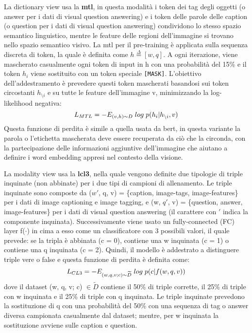 La dictionary view usa la \textbf{\acrfull{mtl}}, in questa modalità i token dei tag degli oggetti (o answer per i dati di visual question answering) e i token delle parole delle caption (o question per i dati di visual question answering) condividono lo stesso spazio semantico linguistico, mentre le feature delle regioni dell'immagine si trovano nello spazio semantico visivo. La \acrlong{mtl} per il pre-training è applicata sulla sequenza discreta di token, la quale è definita come $h \stackrel{\Delta}{=} [w, q]$. A ogni iterazione, viene mascherato casualmente ogni token di input in h con una probabilità del 15\% e il token $h_i$ viene sostituito con un token speciale \texttt {[MASK]}. L'obiettivo dell'addestramento è prevedere questi token mascherati basandosi sui token circostanti $h_{\setminus i}$ e su tutte le feature dell'immagine v, minimizzando la log-likelihood negativa:
\begin{equation*}
L_{MTL} = -E_{(v, h) \sim D} \hspace{0.1cm} log \hspace{0.1cm} p(h_i|h_{\setminus i},v)
\end{equation*}
Questa funzione di perdita è simile a quella usata da \acrshort{bert}, in questa variante la parola o l'etichetta mascherata deve essere recuperata da ciò che la circonda, con la partecipazione delle informazioni aggiuntive dell'immagine che aiutano a definire i word embedding appresi nel contesto della visione.


La modality view usa la \textbf{\acrfull{lcl3}}, nella quale vengono definite due tipologie di triple inquinate (non abbinate) per i due tipi di campioni di allenamento. Le triple inquinate sono composte da ($w'$, q, v) = \{caption, image-tags, image-features\} per i dati di image captioning e image tagging, e (w, $q'$, v) = \{question, answer, image-features\} per i dati di visual question answering (il carattere con $'$ indica la componente inquinata). Successivamente viene usato un fully-connected (FC) layer f($\cdot$) in cima a esso come un classificatore con 3 possibili valori, il quale prevede: se la tripla è abbinata (c = 0), contiene una w inquinata (c = 1) o contiene una q inquinata (c = 2).
Quindi, il modello è addestrato a distinguere triple vere o false e questa funzione di perdita è definita come:
\begin{equation*}
L_{CL3} = -E_{(w, q, v; c) \sim \widetilde{D}} \hspace{0.1cm} log \hspace{0.1cm} p(c|f(w, q, v))
\end{equation*}
dove il dataset (w, q, v; c) $\in \widetilde{D}$ contiene il 50\% di triple corrette, il 25\% di triple con w inquinata e il 25\% di triple con q inquinata. 
Le triple inquinate prevedono la sostituzione di q con una probabilità del 50\% con una sequenza di tag o answer diversa campionata casualmente dal dataset; mentre, per w inquinata la sostituzione avviene sulle caption e question.


